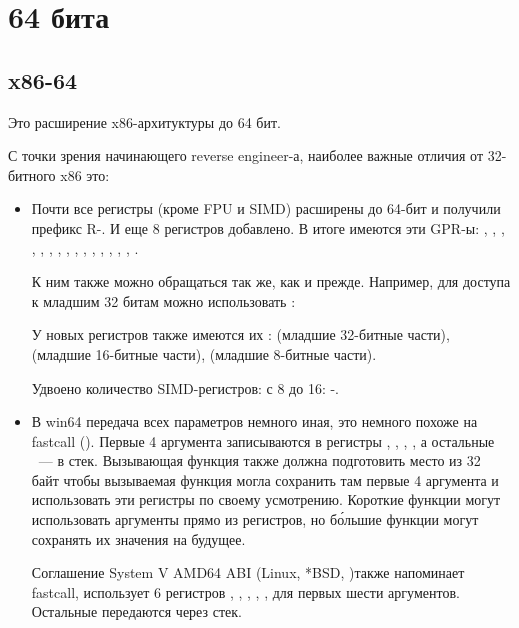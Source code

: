 \chapter{64 бита}

\section{x86-64}
\label{x86-64}

Это расширение x86-архитуктуры до 64 бит.

С точки зрения начинающего reverse engineer-а, наиболее важные отличия от 32-битного x86 это:

\myindex{\CLanguageElements!\Pointers}
\begin{itemize}

\item
Почти все регистры (кроме FPU и SIMD) расширены до 64-бит и получили префикс R-. 
И еще 8 регистров добавлено. 
В итоге имеются эти \ac{GPR}-ы:
 \RAX, \RBX, \RCX, \RDX, 
\RBP, \RSP, \RSI, \RDI, , , , 
, , , , . 

К ним также можно обращаться так же, как и прежде. Например, для доступа к младшим 32 битам \RAX 
можно использовать \EAX:


У новых регистров  также имеются их :  
(младшие 32-битные части), 
 (младшие 16-битные части),  (младшие 8-битные части).


Удвоено количество SIMD-регистров: с 8 до 16: -.

\item
В win64 передача всех параметров немного иная, это немного похоже на fastcall 
().
Первые 4 аргумента записываются в регистры \RCX, \RDX, , , а остальные ~--- в стек. 
Вызывающая функция также должна подготовить место из 32 байт чтобы вызываемая функция могла сохранить 
там первые 4 аргумента и использовать эти регистры по своему усмотрению. 
Короткие функции могут использовать аргументы прямо из регистров, но б\'{о}льшие функции могут сохранять 
их значения на будущее.

Соглашение System V AMD64 ABI (Linux, *BSD, \MacOSX)\SysVABI также напоминает
fastcall, использует 6 регистров 
\RDI, \RSI, \RDX, \RCX, ,  для первых шести аргументов.
Остальные передаются через стек.


\end{itemize}
